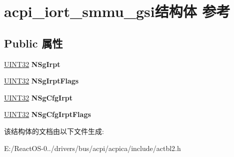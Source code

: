 \hypertarget{structacpi__iort__smmu__gsi}{}\section{acpi\+\_\+iort\+\_\+smmu\+\_\+gsi结构体 参考}
\label{structacpi__iort__smmu__gsi}
\subsection*{Public 属性}
\begin{DoxyCompactItemize}
\item 
\mbox{\label{structacpi__iort__smmu__gsi_acfea8a389d467ec11eaf7ae2ad6bcb18}} 
\hyperlink{_processor_bind_8h_ae1e6edbbc26d6fbc71a90190d0266018}{U\+I\+N\+T32} {\bfseries N\+Sg\+Irpt}
\item 
\mbox{\label{structacpi__iort__smmu__gsi_a3fd883275cded7033e47d37545ce42ed}} 
\hyperlink{_processor_bind_8h_ae1e6edbbc26d6fbc71a90190d0266018}{U\+I\+N\+T32} {\bfseries N\+Sg\+Irpt\+Flags}
\item 
\mbox{\label{structacpi__iort__smmu__gsi_a9a9811826d96c77bd43e69c95397e2a8}} 
\hyperlink{_processor_bind_8h_ae1e6edbbc26d6fbc71a90190d0266018}{U\+I\+N\+T32} {\bfseries N\+Sg\+Cfg\+Irpt}
\item 
\mbox{\label{structacpi__iort__smmu__gsi_acdad7d753ec01b28b5828160fb4496d9}} 
\hyperlink{_processor_bind_8h_ae1e6edbbc26d6fbc71a90190d0266018}{U\+I\+N\+T32} {\bfseries N\+Sg\+Cfg\+Irpt\+Flags}
\end{DoxyCompactItemize}


该结构体的文档由以下文件生成\+:\begin{DoxyCompactItemize}
\item 
E\+:/\+React\+O\+S-\/0../drivers/bus/acpi/acpica/include/actbl2.\+h\end{DoxyCompactItemize}
